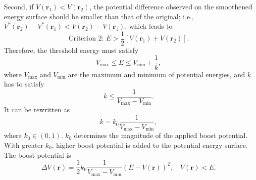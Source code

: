Second, if $V(\mathbf{r}_1)<V(\mathbf{r}_2)$, the potential difference observed on the smoothened energy surface should be smaller than that of the original; i.e., $V^\ast(\mathbf{r}_2)-V^\ast(\mathbf{r}_1)<V(\mathbf{r}_2)-V(\mathbf{r}_1)$, which leads to
\begin{equation}
	\text{Criterion 2: } E>\frac{1}{2}\left[V(\mathbf{r}_1)+V(\mathbf{r}_2)\right].
\end{equation}
Therefore, the threshold energy must satisfy
\begin{equation}
	V_{\mathrm{max}}\leq E \leq V_{\mathrm{min}}+\frac{1}{k},
\end{equation}
where $V_{\mathrm{max}}$ and $V_{\mathrm{min}}$ are the maximum and minimum of potential energies, and $k$ has to satisfy
\begin{equation}
	k\leq \frac{1}{V_{\mathrm{max}}-V_{\mathrm{min}}}.
\end{equation}
It can be rewritten as
\begin{equation}
	k=k_0\frac{1}{V_{\mathrm{max}}-V_{\mathrm{min}}},
\end{equation}
where $k_0\in (0,1)$. $k_0$ determines the magnitude of the applied boost potential. With greater $k_0$, higher boost potential is added to the potential energy surface. The boost potential is
\begin{equation}
	\Delta V(\mathbf{r})=\frac{1}{2} k_{0} \frac{1}{V_{\max }-V_{\min }}(E-V(\mathbf{r}))^{2}, \quad V(\mathbf{r})<E.
\end{equation}

